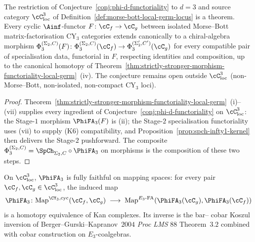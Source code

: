 \begin{corollary}[Conjecture~\ref{conj:phi-d-functoriality} as a theorem at \texorpdfstring{$d = 3$}{d = 3} on \texorpdfstring{$\cC_{\mathrm{loc}}^3$}{C-loc-3}]
\label{cor:conj-phi-d-functoriality-theorem-on-morse-bott-d3}
The restriction of Conjecture~\ref{conj:phi-d-functoriality} to $d = 3$
and source category $\cC_{\mathrm{loc}}^3$ of
Definition~\ref{def:morse-bott-local-germ-locus} is a theorem. Every
cyclic $\Ainf$-functor $F \colon \cC_f \to \cC_g$ between isolated
Morse--Bott matrix-factorisation CY$_3$ categories extends canonically
to a chiral-algebra morphism
$\Phi_3^{(\Sigma_2, C)}(F) \colon
\Phi_3^{(\Sigma_2, C)}(\cC_f) \to \Phi_3^{(\Sigma'_2, C')}(\cC_g)$
for every compatible pair of specialisation data, functorial in $F$,
respecting identities and composition, up to the canonical homotopy
of Theorem~\ref{thm:strictly-stronger-morphism-functoriality-local-germ}~\textup{(iv)}.
The conjecture remains open outside $\cC_{\mathrm{loc}}^3$ (non-
Morse--Bott, non-isolated, non-compact CY$_3$ loci).
\end{corollary}

\begin{proof}
Theorem~\ref{thm:strictly-stronger-morphism-functoriality-local-germ}~\textup{(i)--(vii)}
supplies every ingredient of Conjecture~\ref{conj:phi-d-functoriality}
on $\cC_{\mathrm{loc}}^3$: the Stage-$1$ morphism $\PhiFA_3(F)$ is
\textup{(ii)}; the Stage-$2$ specialisation functoriality uses
\textup{(vii)} to supply \textup{(K6)} compatibility, and
Proposition~\ref{prop:spch-infty1-kernel} then delivers the
Stage-$2$ pushforward. The composite
$\Phi_3^{(\Sigma_2, C)} = \SpCh_{\Sigma_2, C} \circ \PhiFA_3$
on morphisms is the composition of these two steps.
\end{proof}

\begin{proposition}
\label{prop:fully-faithful-mapping-space-local-germ}
On $\cC_{\mathrm{loc}}^3$, $\PhiFA_3$ is fully faithful on
mapping spaces: for every pair $\cC_f, \cC_g \in \cC_{\mathrm{loc}}^3$,
the induced map
\[
 \PhiFA_3 \colon
 \mathrm{Map}^{\CY_3, \mathrm{cyc}}(\cC_f, \cC_g)
 \;\longrightarrow\;
 \mathrm{Map}^{E_3\text{-FA}}(\PhiFA_3(\cC_g), \PhiFA_3(\cC_f))
\]
is a homotopy equivalence of Kan complexes. Its inverse is the bar--
cobar Koszul inversion of Berger--Gurski--Kapranov~$2004$
\textit{Proc LMS} $88$ Theorem~$3.2$ combined with cobar construction
on $E_3$-coalgebras.
\end{proposition}

